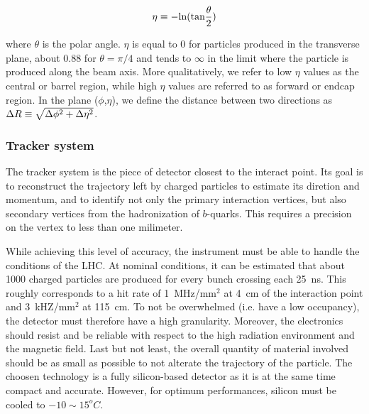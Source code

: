         $$ \eta \equiv - \text{ln}(\text{tan}\frac{\theta}{2}) $$

        where $\theta$ is the polar angle. $\eta$ is equal to 0 for particles produced in
        the transverse plane, about 0.88 for $\theta = \pi/4$ and tends to $\infty$ in the
        limit where the particle is produced along the beam axis. More qualitatively, we
        refer to low $\eta$ values as the central or barrel region, while high $\eta$ values
        are referred to as forward or endcap region. In the plane ($\phi$,$\eta$), we
        define the distance between two directions as $\Delta R \equiv \sqrt{\Delta
        \phi^2 + \Delta \eta^2}$.


            \subsubsection{Tracker system}

        The tracker system is the piece of detector closest to the interact point. Its goal
        is to reconstruct the trajectory left by charged particles to estimate its diretion
        and momentum, and to identify not only the primary interaction vertices, but also
        secondary vertices from the hadronization of $b$-quarks. This requires a precision
        on the vertex to less than one milimeter.

        While achieving this level of accuracy, the instrument must be able to handle the conditions of
        the LHC. At nominal conditions, it can be estimated that about 1000 charged particles
        are produced for every bunch crossing each 25~ns. This roughly corresponds to a
        hit rate of 1~MHz/mm$^2$ at 4~cm of the interaction point and 3~kHZ/mm$^2$ at 115~cm.
        To not be overwhelmed (i.e. have a low occupancy), the detector must therefore
        have a high granularity. Moreover, the electronics should resist and be reliable with
        respect to the high radiation environment and the magnetic field. Last but not
        least, the overall quantity of material involved should be as small as possible to
        not alterate the trajectory of the particle. The choosen technology is a fully
        silicon-based detector as it is at the same time compact and accurate. However,
        for optimum performances, silicon must be cooled to $-10\sim15^oC$.


